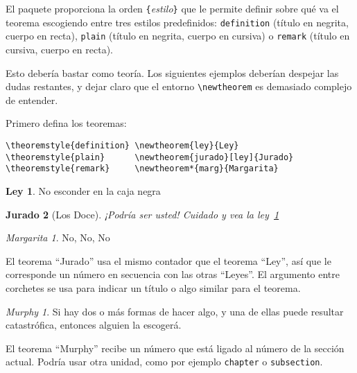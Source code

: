 El paquete   proporciona la orden \verb|{|\emph{estilo}\verb|}| que le permite definir sobre qué va el teorema escogiendo entre tres estilos predefinidos: \texttt{definition} (título en negrita, cuerpo en recta), \texttt{plain} (título en negrita, cuerpo en cursiva) o \texttt{remark} (título en cursiva, cuerpo en recta).

Esto debería bastar como teoría.  Los siguientes ejemplos deberían despejar las dudas restantes, y dejar claro que el entorno \verb|\newtheorem| es demasiado complejo de entender.

\theoremstyle{definition} \newtheorem{ley}{Ley}
\theoremstyle{plain}      \newtheorem{jurado}[ley]{Jurado}
\theoremstyle{remark}     \newtheorem*{marg}{Margarita}

Primero defina los teoremas:

\begin{verbatim}
\theoremstyle{definition} \newtheorem{ley}{Ley}
\theoremstyle{plain}      \newtheorem{jurado}[ley]{Jurado}
\theoremstyle{remark}     \newtheorem*{marg}{Margarita}
\end{verbatim}

\begin{example}
\begin{ley} \label{ley:caja}
No esconder en la caja negra
\end{ley}
\begin{jurado}[Los Doce]
¡Podría ser usted!  Cuidado y
vea la ley~\ref{ley:caja}
\end{jurado}
\begin{marg}No, No, No\end{marg}
\end{example}

El teorema ``Jurado'' usa el mismo contador que el teorema ``Ley'', así que le corresponde un número en secuencia con las otras ``Leyes''.  El argumento entre corchetes se usa para indicar un título o algo similar para el teorema.
\begin{example}
\flushleft
\newtheorem{mur}{Murphy}[section]
\begin{mur}
Si hay dos o más formas de
hacer algo, y una de ellas
puede resultar catastrófica,
entonces alguien la escogerá.
\end{mur}
\end{example}

El teorema ``Murphy'' recibe un número que está ligado al número de la sección actual.  Podría usar otra unidad, como por ejemplo \verb+chapter+ o \verb+subsection+.

